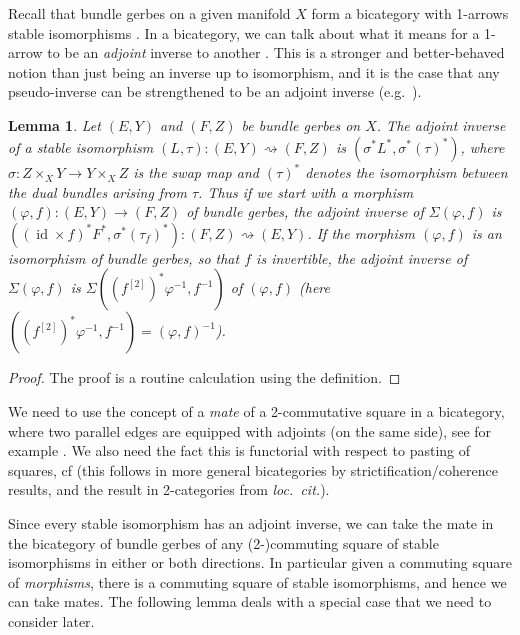 \documentclass[12pt]{amsart}
\DeclareMathOperator{\id}{id}
\theoremstyle{plain}
\newtheorem{lemma}[theorem]{Lemma}
\theoremstyle{definition}
\theoremstyle{remark}
\numberwithin{equation}{section}
\newcommand{\<}{\langle}
\renewcommand{\>}{\rangle}
\begin{document}
Recall that bundle gerbes on a given manifold $X$ form a bicategory  with 1-arrows stable isomorphisms \cite[Proposition~3.9]{StevPhD}.
In a bicategory, we can talk about what it means for a 1-arrow to be an \emph{adjoint} inverse to another \cite[Proposition~6.2.1]{Johnson-Yau}.
This is a stronger and better-behaved notion than just being an inverse up to isomorphism, and it is the case that any pseudo-inverse can be strengthened to be an adjoint inverse (e.g.\ \cite[Proposition~6.2.4]{Johnson-Yau}).


\begin{lemma}\label{lemma:bundlegerbemorphisms}
Let $(E,Y)$ and $(F,Z)$ be bundle gerbes on $X$. The adjoint inverse of a stable isomorphism $(L,\tau)\colon (E,Y) \rightsquigarrow (F,Z)$ is $(\sigma^*L^*,\sigma^*(\tau)^*)$, where $\sigma\colon Z\times_X Y\to Y\times_X Z$ is the swap map and $(\tau)^*$ denotes the isomorphism between the dual bundles arising from $\tau$.
Thus if we start with a \emph{morphism} $(\varphi,f)\colon (E,Y)\to (F,Z)$ of bundle gerbes, the adjoint inverse of $\Sigma(\varphi,f)$ is $((\id\times f)^*F^*,\sigma^* (\tau_f)^*)\colon (F,Z) \rightsquigarrow (E,Y)$.
If the morphism $(\varphi,f)$ is an \emph{isomorphism} of bundle gerbes, so that $f$ is invertible, the adjoint inverse of $\Sigma(\varphi,f)$ is $\Sigma((f^{[2]})^*\varphi^{-1},f^{-1})$ of $(\varphi,f)$ (here $((f^{[2]})^*\varphi^{-1},f^{-1}) = (\varphi,f)^{-1}$).
\end{lemma}

\begin{proof}
The proof is a routine calculation using the definition.
\end{proof}


We need to use the concept of a \emph{mate} of a 2-commutative square in a bicategory, where two parallel edges are equipped with adjoints (on the same side), see for example \cite[Definition~6.1.12]{Johnson-Yau}. 
We also need the fact this is functorial with respect to pasting of squares, cf \cite[Proposition 2.2]{Kelly-Steet_74} (this follows in more general bicategories by strictification/coherence results, and the result in 2-categories from \emph{loc.\ cit.}).

Since every stable isomorphism has an adjoint inverse, we can take the mate in the bicategory of bundle gerbes of any (2-)commuting square of stable isomorphisms in either or both directions. 
In particular given a commuting square of \emph{morphisms}, there is a commuting square of stable isomorphisms, and hence we can take mates. 
The following lemma deals with a special case that we need to consider later.
\end{document}
